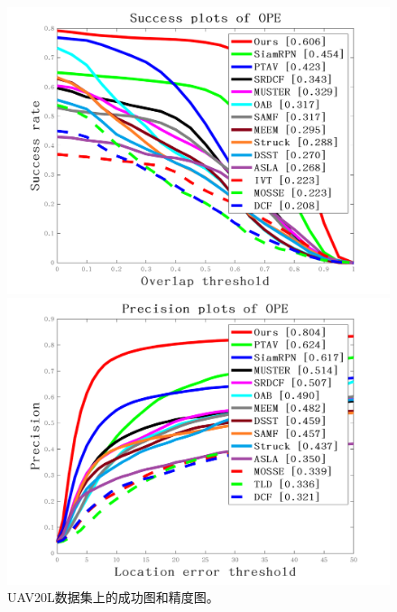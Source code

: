 \begin{figure}[t]
\begin{minipage}[b]{0.5\textwidth}
  \centering
  \centerline{\includegraphics[width=1.0\textwidth]{Img/end/quality_plot_overlap_OPE_AUC.png}}
\end{minipage}
\hfill
\begin{minipage}[b]{0.5\textwidth}
  \centering
  \centerline{\includegraphics[width=1.0\textwidth]{Img/end/quality_plot_error_OPE_threshold.png}}
\end{minipage}
%
\caption{UAV20L数据集上的成功图和精度图。}
\label{fig:uav20l}
%
\end{figure}
